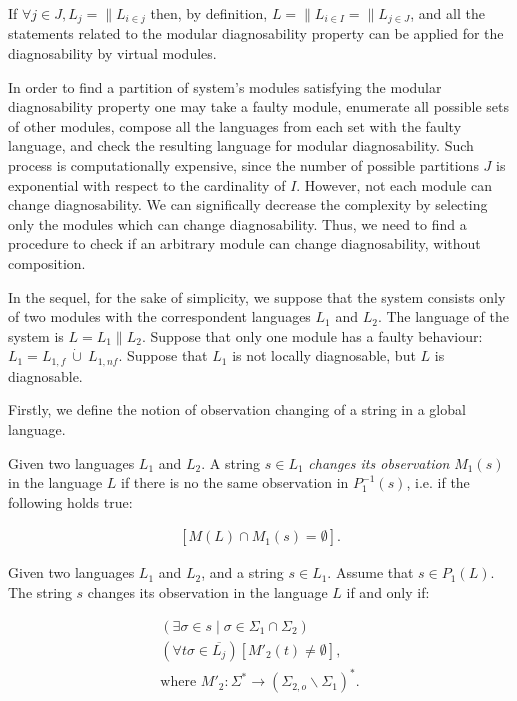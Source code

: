 \documentclass[a4paper, 10pt, conference]{ieeeconf}
\begin{document}
If $\forall j \in J, L_{j} = \parallel L_{i \in j}$ then, by definition, $L =
\parallel L_{i \in I} = \parallel L_{j \in J}$, and all the statements related
to the modular diagnosability  property can be applied for the diagnosability by
virtual modules.

In order to find a partition of system's modules satisfying the modular
diagnosability property one may take a faulty module, enumerate all possible
sets of other modules, compose all the languages from each set with the faulty
language, and check the resulting language for modular diagnosability.
Such process is computationally expensive, since the number of possible
partitions $J$ is exponential with respect to the cardinality of $I$. However,
not each module can change diagnosability. We can significally decrease the
complexity by selecting only the modules which can change diagnosability. Thus,
we need to find a procedure to check if an arbitrary module can change
diagnosability, without composition.

In the sequel, for the sake of simplicity, we suppose that the system consists
only of two modules with the correspondent languages $L_1$ and $L_2$. The
language of the system is $L = L_1 \parallel L_2$. Suppose that only one module
has a faulty behaviour: $L_1 = L_{1,f} ~\dot{\cup}~ L_{1,nf}$.
Suppose that $L_1$ is not locally diagnosable, but $L$ is diagnosable.

Firstly, we define the notion of observation changing of a string in a global
language.
\begin{definition}Given two languages $L_1$ and $L_2$. A string $s \in
L_1$ \emph{changes its observation} $M_1(s)$ in the language $L$ if
there is no the same observation in $P_1^{-1}(s)$, i.e.
if the following holds true:
\end{definition}
\begin{equation}
\label{def:obs}
\begin{array}{l}
	\left[ M(L) \cap M_1(s) = \emptyset \right].
\end{array}
\end{equation}

\begin{lemma}
\label{lem_changed_observation}
Given two languages $L_1$ and $L_2$, and a string $s \in L_1$.
Assume that $s \in P_1(L)$. The string $s$ changes its observation in the
language $L$ if and only if:
\end{lemma}
\begin{subequations}\label{lem:obs}
\begin{align}
	(\exists \sigma \in s \mid \sigma \in \Sigma_1 \cap \Sigma_2)
	\label{lem:obs1}
	\\
	(\forall t\sigma \in \overline{L_j})
	\left[M'_2(t) \neq \emptyset \right],
	\label{lem:obs2}
	\\
	\textrm{where } M'_2: \Sigma^* \rightarrow (\Sigma_{2,o} \backslash
	\Sigma_1)^*. 
	\label{lem:obs3}
\end{align}
\end{subequations}
\end{document}
